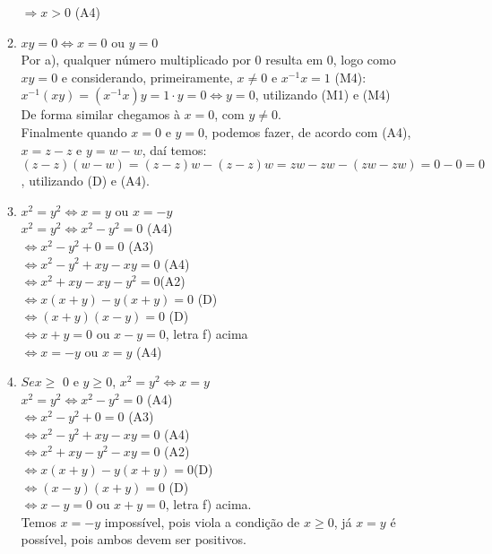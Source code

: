 \documentclass[10pt]{book}
\begin{document}
\begin{enumerate}
\begin{enumerate}
			$\Rightarrow x > 0$  (A4)
			\item %
			$xy = 0 \Leftrightarrow x = 0$ ou $y = 0$\\
			Por a), qualquer número multiplicado por 0 resulta em 0, logo como $xy = 0$ e considerando, primeiramente, $x \neq 0$ e $x^{-1}x=1$ (M4):\\ 
			$x^{-1}(xy) = (x^{-1}x)y =1 \cdot y = 0 \Leftrightarrow y = 0$, utilizando (M1) e (M4)\\
			De forma similar chegamos à $x = 0$, com $y \neq 0$.\\
			Finalmente quando $x = 0$ e $y = 0$, podemos fazer, de acordo com (A4), $x = z - z$   e $y = w - w$, daí temos:\\
			$(z-z)(w-w) = (z-z)w-(z-z)w=zw-zw-(zw-zw)=0-0=0$, utilizando (D) e (A4).
			\item %
			$x^2 = y^2 \Leftrightarrow x = y$ ou $x = -y$\\
			$x^2 = y^2 \Leftrightarrow x^2 - y^2 = 0$ (A4)\\ 
			$\Leftrightarrow x^2 - y^2 + 0 = 0$ (A3) \\
			$\Leftrightarrow x^2 - y^2 + xy - xy = 0$ (A4)\\ 
			$\Leftrightarrow x^2 + xy - xy - y^2 = 0$(A2)\\ 
			$\Leftrightarrow x(x + y) - y(x + y) = 0$ (D)\\ 
			$\Leftrightarrow (x + y)(x - y) = 0$ (D)\\ 
			$\Leftrightarrow x + y = 0$ ou $x - y = 0$, letra f) acima\\ 
			$\Leftrightarrow x = -y$ ou $x = y$ (A4)
			\item %
			$Se x \geq$ 0 e $y\geq 0$, $x^2 = y^2 \Leftrightarrow x = y$\\
			$x^2 = y^2\Leftrightarrow x^2 - y^2 = 0$ (A4)\\
			$\Leftrightarrow x^2 - y^2 + 0 = 0$ (A3)\\
			$\Leftrightarrow x^2 - y^2 + xy - xy = 0$ (A4)\\
			$\Leftrightarrow x^2 + xy - y^2 - xy = 0$ (A2)\\
			$\Leftrightarrow x(x+y)-y(x+y)=0$(D)\\
			$\Leftrightarrow (x-y)(x+y) = 0$ (D)\\
			$\Leftrightarrow x - y = 0$ ou $x + y = 0$, letra f) acima. \\
			Temos $x = -y$ impossível, pois viola a condição de $ x \geq 0 $, já $x = y$ é possível, pois ambos devem ser positivos.
		\end{enumerate}
\end{enumerate}
\end{document}
